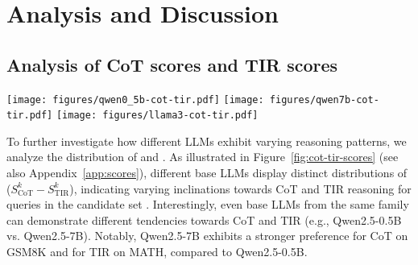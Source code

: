 \section{Analysis and Discussion}\label{sec:analysis}



\subsection{Analysis of CoT scores and TIR scores}\label{sec:ana_scores}

\begin{figure*}[t]
    \centering
    \texttt{[image: figures/qwen0\_5b-cot-tir.pdf]}
    \texttt{[image: figures/qwen7b-cot-tir.pdf]}
    \texttt{[image: figures/llama3-cot-tir.pdf]}
    \caption{The distribution of ($S_{\text{CoT}}^k - S_{\text{TIR}}^k$): Qwen2.5-0.5B (left), Qwen2.5-7B (middle), LLaMA-3-8B (right).}
    \label{fig:cot-tir-scores}
\end{figure*}

To further investigate how different LLMs exhibit varying reasoning patterns, we analyze the distribution of {\scote} and {\stire}. 
As illustrated in Figure~\ref{fig:cot-tir-scores} (see also Appendix~\ref{app:scores}), different base LLMs display distinct distributions of ($S_{\text{CoT}}^k - S_{\text{TIR}}^k$), indicating varying inclinations towards CoT and TIR reasoning for queries in the candidate set {\dcandidatee}. 
Interestingly, even base LLMs from the same family can demonstrate different tendencies towards CoT and TIR (e.g., Qwen2.5-0.5B vs. Qwen2.5-7B).
Notably, Qwen2.5-7B exhibits a stronger preference for CoT on GSM8K and for TIR on MATH, compared to Qwen2.5-0.5B.











